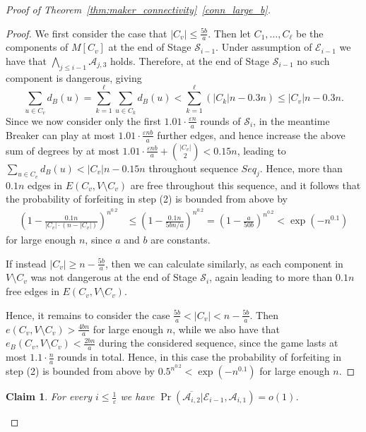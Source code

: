 \documentclass[11pt, a4paper]{article}
\numberwithin{equation}{section}
\numberwithin{figure}{section}
\newtheorem{claim}[theorem]{Claim}
\newcommand{\Prob}{\operatorname{Pr}}
\begin{document}
\begin{proof}[Proof of Theorem~\ref{thm:maker_connectivity}~\ref{conn_large_b}]
\begin{proof}
We first consider the case that $|C_v|\leq \frac{5b}{a}$. Then
let $C_1,\ldots,C_{\ell}$ be the components of $M[C_v]$
at the end of Stage $\mathcal{S}_{i-1}$.
Under assumption of $\mathcal{E}_{i-1}$
we have that $\bigwedge_{j\leq i-1} \mathcal{A}_{j,3}$
holds. Therefore, at the end of Stage $\mathcal{S}_{i-1}$ no such component
is dangerous, giving
$$
\sum_{u\in C_v} d_B(u)
=
\sum_{k=1}^{\ell} \sum_{u\in C_k} d_B(u)
<
\sum_{k=1}^{\ell} (|C_k|n - 0.3n)
\leq
|C_v|n - 0.3n.
$$ 
Since we now consider only the first $1.01\cdot \frac{\varepsilon n}{a}$ rounds of $\mathcal{S}_{i}$,
in the meantime Breaker can play at most
$1.01\cdot \frac{\varepsilon nb}{a}$ further edges, and hence increase the above sum of degrees by at most
$1.01\cdot \frac{\varepsilon nb}{a} + \binom{|C_v|}{2}<0.15n$, leading to
$
\sum_{u\in C_v} d_B(u)
<
|C_v|n - 0.15n
$
throughout sequence $Seq_j$.
Hence, more than $0.1n$ edges in $E(C_v,V\setminus C_v)$ are free throughout this sequence, and it follows
that the probability of forfeiting in step (2) is bounded from above by
\begin{align*}
\left( 1 - \frac{0.1n}{|C_v|\cdot (n-|C_v|)} \right)^{n^{0.2}}
& \leq 
\left( 1 - \frac{0.1n}{5bn/a} \right)^{n^{0.2}} 
=
\left( 1 - \frac{a}{50b} \right)^{n^{0.2}} 
<
\exp\left( - n^{0.1}\right)
\end{align*}
for large enough $n$, since $a$ and $b$ are constants.

If instead $|C_v|\geq n - \frac{5b}{a}$,
then we can calculate similarly,
as each component in $V\setminus C_v$ was not dangerous
at the end of Stage $\mathcal{S}_i$,
again leading to more than $0.1n$ free edges in $E(C_v,V\setminus C_v)$.

Hence, it remains to consider the case 
$\frac{5b}{a} < |C_v| < n-\frac{5b}{a}$.
Then $e(C_v,V\setminus C_v) > \frac{4bn}{a}$
for large enough $n$,
while we also have that 
$e_B(C_v,V\setminus C_v) < \frac{2bn}{a}$ during the considered sequence, since the game lasts at most $1.1\cdot \frac{n}{a}$ rounds in total. Hence, in this case
the probability of forfeiting in step (2) is bounded from above by
$0.5^{n^{0.2}} <
\exp\left( - n^{0.1}\right)$
for large enough $n$.
\end{proof}



\begin{claim}
For every $i\leq \frac{1}{\varepsilon}$ we have
$\Prob(\overline{\mathcal{A}_{i,2}}|\mathcal{E}_{i-1},\mathcal{A}_{i,1}) = o(1)$.
\end{claim}


\end{proof}
\end{document}

